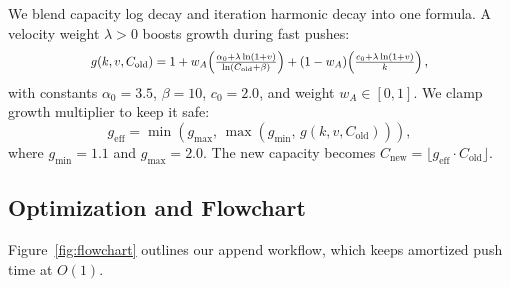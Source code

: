 \documentclass[conference]{IEEEtran}
\begin{document}
We blend capacity log decay and iteration harmonic decay into one formula. A velocity weight $\lambda > 0$ boosts growth during fast pushes:
\begin{equation}
    \scalebox{0.88}{$g(k,v,C_{\text{old}}) = 1 + w_A \!\left( \frac{\alpha_0 + \lambda \ln(1+v)}{\ln(C_{\text{old}} + \beta)} \right) + (1-w_A) \!\left( \frac{c_0 + \lambda \ln(1+v)}{k} \right),$}
    \label{eq:hybrid}
\end{equation}
with constants $\alpha_0 = 3.5$, $\beta = 10$, $c_0 = 2.0$, and weight $w_A \in [0,1]$. We clamp growth multiplier to keep it safe:
\begin{equation}
    g_{\text{eff}} = \min\!\left(g_{\max},\, \max\!\left(g_{\min},\, g(k,v,C_{\text{old}})\right)\right),
    \label{eq:clamped}
\end{equation}
where $g_{\min} = 1.1$ and $g_{\max} = 2.0$. The new capacity becomes $C_{\text{new}} = \lfloor g_{\text{eff}} \cdot C_{\text{old}} \rfloor$.

\subsection{Optimization and Flowchart}
Figure~\ref{fig:flowchart} outlines our append workflow, which keeps amortized push time at $O(1)$.
\end{document}
